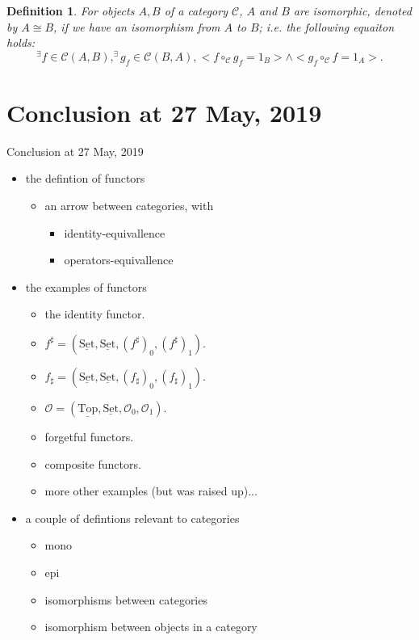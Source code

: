 \documentclass[dvipdfmx,10pt,notheorems]{beamer}
\newtheorem{definition}[theorem]{Definition}
\renewcommand{\#}{^\sharp}
\begin{document}
	\begin{frame}
			\begin{definition}	
					For objects $A,B$ of a category $\mathcal{C}$,
					$A$ and $B$ are isomorphic, denoted by $A\cong B$, if we have an isomorphism from $A$ to $B$;
					i.e. the following equaiton holds:
							$${}^\exists f\in\mathcal{C}(A,B),
							^\exists g_f\in\mathcal{C}(B,A),<f\circ_{\mathcal{C}}g_f=1_B>\wedge<g_f\circ_{\mathcal{C}}f=1_A>.$$
			\end{definition}
	\end{frame}



\section{Conclusion at 27 May, 2019}
	\begin{frame}{Conclusion at 27 May, 2019}
		\begin{itemize}
 			\item the defintion of functors
					\begin{itemize}
							\item an arrow between categories, with
									\begin{itemize}
											\item identity-equivallence
											\item operators-equivallence
									\end{itemize}
					\end{itemize}
			\item the examples of functors
					\begin{itemize}
							\item the identity functor.
							\item $f^\sharp=(\underline{\mathrm{Set}},\underline{\mathrm{Set}},
							(f^\sharp)_0,(f^\sharp)_1)$.
							\item $f_\sharp=(\underline{\mathrm{Set}},\underline{\mathrm{Set}},
							(f_\sharp)_0,(f_\sharp)_1)$.
							\item $\mathcal{O}=(\underline{\mathrm{Top}},\underline{\mathrm{Set}},\mathcal{O}_0,\mathcal{O}_1)$.
							\item forgetful functors.
							\item composite functors.
							\item more other examples (but was raised up)...
					\end{itemize}
			 \item a couple of defintions relevant to categories 
					\begin{itemize}
							\item mono
							\item epi
							\item isomorphisms between categories
							\item isomorphism between objects in a category
					\end{itemize}

		\end{itemize}
	\end{frame}
\end{document}
